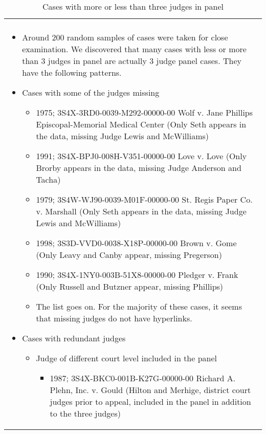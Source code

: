 \documentclass[10pt, letterpaper]{article}
\begin{document}
\begin{spacing}{1.0}
\clearpage

\begin{longtable}{p{6.5in}}
    \caption{Cases with more or less than three judges in panel}\\
    \hline\\[-20pt]
    
    \begin{itemize}
        
        \item Around 200 random samples of cases were taken for close examination. We discovered that many cases with less or more than 3 judges in panel are actually 3 judge panel cases. They have the following patterns.
        
        \item Cases with some of the judges missing
            \begin{itemize}
                \item 1975; 3S4X-3RD0-0039-M292-00000-00 Wolf v. Jane Phillips Episcopal-Memorial Medical Center 
                (Only Seth appears in the data, missing Judge Lewis and McWilliams)
                
                \item 1991; 3S4X-BPJ0-008H-V351-00000-00 Love v. Love 
                (Only Brorby appears in the data, missing Judge Anderson and Tacha)
                
                \item 1979; 3S4W-WJ90-0039-M01F-00000-00 St. Regis Paper Co. v. Marshall 
                (Only Seth appears in the data, missing Judge Lewis and McWilliams)
                
                \item 1998; 3S3D-VVD0-0038-X18P-00000-00 Brown v. Gome 
                (Only Leavy and Canby appear, missing Pregerson)
                
                \item 1990; 3S4X-1NY0-003B-51X8-00000-00 Pledger v. Frank
                (Only Russell and Butzner appear, missing Phillips)
                
                \item The list goes on. For the majority of these cases, it seems that missing judges do not have hyperlinks.
            \end{itemize}
    
        \item Cases with redundant judges
            \begin{itemize}            
                \item Judge of different court level included in the panel
                \begin{itemize} 
                    \item 1987; 3S4X-BKC0-001B-K27G-00000-00 Richard A. Plehn, Inc. v. Gould 
                    (Hilton and Merhige, district court judges prior to appeal, included in the panel in addition to the three judges)
                

\end{itemize}
\end{itemize}
\end{itemize}
\end{longtable}
\end{spacing}
\end{document}
